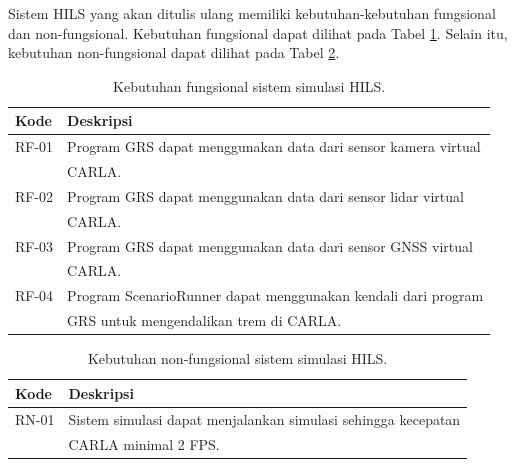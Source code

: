 Sistem HILS yang akan ditulis ulang memiliki kebutuhan-kebutuhan fungsional dan
non-fungsional. Kebutuhan fungsional dapat dilihat pada Tabel
\ref{chapter-3-tbl-functional-requirement}. Selain itu, kebutuhan non-fungsional
dapat dilihat pada Tabel \ref{chapter-3-tbl-non-functional-requirement}.
\begin{table}[!htbp]
	\centering
	\begin{tabular}{|l|l|}
		\hline
		\textbf{Kode} & \textbf{Deskripsi}                                            \\
		\hline
		RF-01         & Program GRS dapat menggunakan data dari sensor kamera virtual \\
		              & CARLA.                                                        \\
		\hline
		RF-02         & Program GRS dapat menggunakan data dari sensor lidar virtual  \\
		              & CARLA.                                                        \\
		\hline
		RF-03         & Program GRS dapat menggunakan data dari sensor GNSS virtual   \\
		              & CARLA.                                                        \\
		\hline
		RF-04         & Program ScenarioRunner dapat menggunakan kendali dari program \\
		              & GRS untuk mengendalikan trem di CARLA.                        \\
		\hline
	\end{tabular}
	\caption{Kebutuhan fungsional sistem simulasi HILS.}
	\label{chapter-3-tbl-functional-requirement}
\end{table}

\begin{table}[!htbp]
	\centering
	\begin{tabular}{|l|l|}
		\hline
		\textbf{Kode} & \textbf{Deskripsi}                                            \\
		\hline
		RN-01         & Sistem simulasi dapat menjalankan simulasi sehingga kecepatan \\
		              & CARLA minimal 2 FPS.                                          \\
		\hline
	\end{tabular}
	\caption{Kebutuhan non-fungsional sistem simulasi HILS.}
	\label{chapter-3-tbl-non-functional-requirement}
\end{table}

